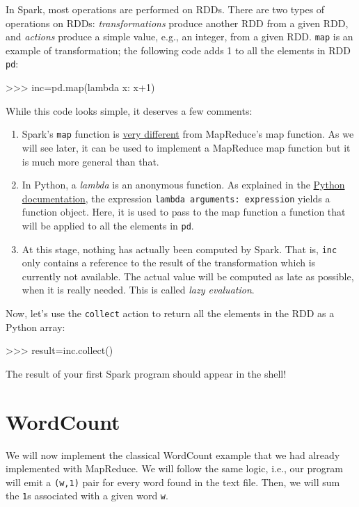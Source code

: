 \documentclass[11pt]{article}
\begin{document}
In Spark, most operations are performed on RDDs. There are two types
of operations on RDDs: \emph{transformations} produce another RDD from
a given RDD, and \emph{actions} produce a simple value, e.g., an
integer, from a given RDD. \texttt{map} is an example of
transformation; the following code adds 1 to all the elements in RDD
\texttt{pd}:
\begin{cli}
  >>> inc=pd.map(lambda x: x+1)
\end{cli}
While this code looks simple, it deserves a few comments:
\begin{enumerate}
\item Spark's \texttt{map} function is \underline{very different} from
  MapReduce's map function. As we will see later, it can be used to
  implement a MapReduce map function but it is much more general than
  that.
\item In Python, a \emph{lambda} is an anonymous function. As
  explained in the
  \href{https://docs.python.org/2/reference/expressions.html#lambda}{Python
    documentation}, the expression \texttt{lambda arguments:
    expression} yields a function object. Here, it is used to pass to
  the map function a function that will be applied to all the elements
  in \texttt{pd}.
  \item At this stage, nothing has actually been computed by
    Spark. That is, \texttt{inc} only contains a reference to the
    result of the transformation which is currently not available. The
    actual value will be computed as late as possible, when it is
    really needed. This is called \emph{lazy evaluation}. 
\end{enumerate}

Now, let's use the \texttt{collect} action to return all the elements
in the RDD as a Python array:
\begin{cli}
  >>> result=inc.collect()
\end{cli}

The result of your first Spark program should appear in the shell!

\section{WordCount}

We will now implement the classical WordCount example that we had
already implemented with MapReduce. We will follow the same logic,
i.e., our program will emit a \texttt{(w,1)} pair for every word found
in the text file. Then, we will sum the \texttt{1}s associated with
a given word \texttt{w}.
\end{document}

